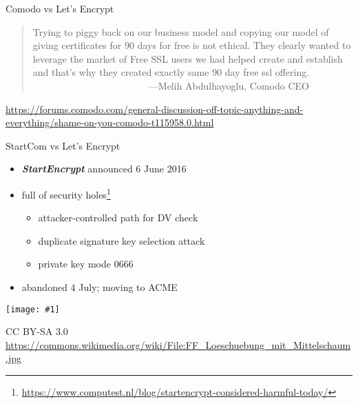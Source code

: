 \documentclass[ignorenonframetext,aspectratio=169]{beamer}
\makeatletter
\def\maxwidth{\ifdim\Gin@nat@width>\linewidth\linewidth\else\Gin@nat@width\fi}
\def\maxheight{\ifdim\Gin@nat@height>\textheight0.8\textheight\else\Gin@nat@height\fi}
\newcommand{\includegraphicsscaled}[1]{
    \texttt{[image: \#1]}
}
\makeatother
\begin{document}
\begin{frame}{Comodo vs Let's Encrypt}
\large
\begin{quote}
  Trying to piggy back on our business model and copying our model
  of giving certificates for 90 days for free is not ethical. They
  clearly wanted to leverage the market of Free SSL users we had
  helped create and establish and that's why they created exactly
  same 90 day free ssl offering.\\
  ~~~~~~~~~~~~~~~~~~~~~~~~---Melih Abdulhayoglu, Comodo CEO
\end{quote}

\bigskip

\tiny

\url{https://forums.comodo.com/general-discussion-off-topic-anything-and-everything/shame-on-you-comodo-t115958.0.html}

\end{frame}

\begin{frame}{StartCom vs Let's Encrypt}

\begin{itemize}
\item
  \textbf{\emph{StartEncrypt}} announced 6 June 2016
\item
  full of security holes\footnote{
    \url{https://www.computest.nl/blog/startencrypt-considered-harmful-today/}}

  \begin{itemize}
  \item
    attacker-controlled path for DV check
  \item
    duplicate signature key selection attack
  \item
    private key mode 0666
  \end{itemize}
\item
  abandoned 4 July; moving to ACME
\end{itemize}

\end{frame}

\begin{frame}[plain]

\begin{center}
\includegraphicsscaled{FF_Loeschuebung_mit_Mittelschaum.jpg}
\end{center}

\tiny

CC BY-SA 3.0
\url{https://commons.wikimedia.org/wiki/File:FF_Loeschuebung_mit_Mittelschaum.jpg}

\end{frame}
\end{document}
